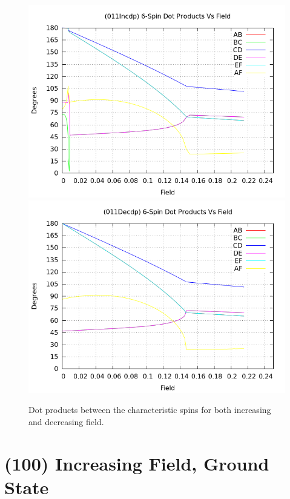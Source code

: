 \documentclass{article}
\begin{document}
\begin{center}
\begin{figure}
\centering
\includegraphics[scale=0.5]{HVariedData/Pictures/011Incdp.png}
\includegraphics[scale=0.5]{HVariedData/Pictures/011Decdp.png}
\caption{Dot products between the characteristic spins for both increasing and decreasing field.}
\end{figure}
\end{center}
\clearpage

\section{(100) Increasing Field, Ground State}
\end{document}
